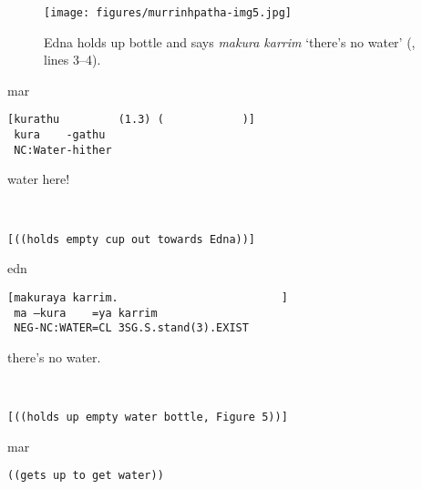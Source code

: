 \documentclass[output=paper,nonflat,colorlinks,citecolor=brown]{langsci/langscibook}
\begin{document}
\begin{figure}
\texttt{[image: figures/murrinhpatha-img5.jpg]}
\caption{Edna holds up bottle and says \textit{makura karrim} ‘there’s no water’ (, lines 3--4).}
\label{fig:blythe:5}
\end{figure}

\vspace{-1mm}
%
\begin{mdframednoverticalspace}[style=firstfoc]
\begin{transbox}{1}{mar}
\begin{verbatim}
[kurathu         (1.3) (            )]
 kura    -gathu
 NC:Water-hither
\end{verbatim}
\hspace{0.07cm} water here!
\end{transbox}
\end{mdframednoverticalspace}\vspace{1mm}
%
\begin{mdframednoverticalspace}[style=firstfoc]
\begin{transbox}{2}{~}
\begin{verbatim}
[((holds empty cup out towards Edna))]
\end{verbatim}
\end{transbox}
\end{mdframednoverticalspace}
%
\begin{mdframednoverticalspace}[style=thirdfoc]
\begin{transbox}{3}{edn}
\begin{verbatim}
[makuraya karrim.                         ]
 ma –kura    =ya karrim
 NEG-NC:WATER=CL 3SG.S.stand(3).EXIST
\end{verbatim}
\hspace{0.07cm} there’s no water.
\end{transbox}
\end{mdframednoverticalspace}\vspace{1mm}
%
\begin{mdframednoverticalspace}[style=thirdfoc]
\begin{transbox}{4}{~}
\begin{verbatim}
[((holds up empty water bottle, Figure 5))]
\end{verbatim}
\end{transbox}
\end{mdframednoverticalspace}\vspace{-2mm}
%
\begin{mdframednoverticalspace}[style=secondfoc]
\begin{transbox}{5}{mar}
\begin{verbatim}
((gets up to get water))
\end{verbatim}
\end{transbox}
\end{mdframednoverticalspace}
\end{document}

